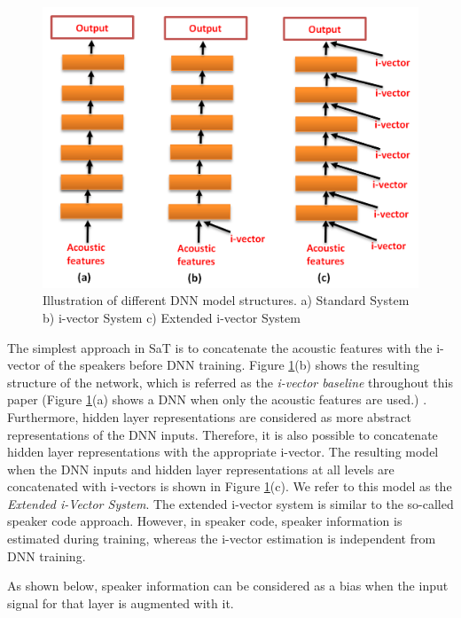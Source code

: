 \documentclass[a4paper]{article}
\begin{document}
   \begin{figure}[ht]
     	\includegraphics[width=\linewidth]{figure4.png}
     	\caption{Illustration of different DNN model structures. a) Standard System b) i-vector System c) Extended i-vector System}
     	\label{fig:diagram1}
     \end{figure}
     
    The simplest approach in SaT is to concatenate the acoustic features with the i-vector of the speakers before DNN training.  Figure \ref{fig:diagram1}(b) shows the resulting structure of the network, which is referred as the \emph{i-vector baseline} throughout this paper (Figure \ref{fig:diagram1}(a) shows a DNN when only the acoustic features are used.) \cite{IVECT}\cite{IVECT1}\cite{IVECT4}. Furthermore, hidden layer representations are considered as more abstract representations of the DNN inputs. Therefore, it is also possible to concatenate hidden layer representations with the appropriate i-vector. The resulting model when the DNN inputs and hidden layer representations at all levels are concatenated with i-vectors is shown in Figure \ref{fig:diagram1}(c). We refer to this model as the \emph{Extended i-Vector System}. The extended i-vector system is similar to the so-called speaker code \cite{SPEAKECODE1} approach. However, in speaker code, speaker information is estimated during training, whereas the i-vector estimation is independent from DNN training. 
      
    As shown below,  speaker information can be considered as a bias when the input signal for that layer is augmented with it.
  
\end{document}
